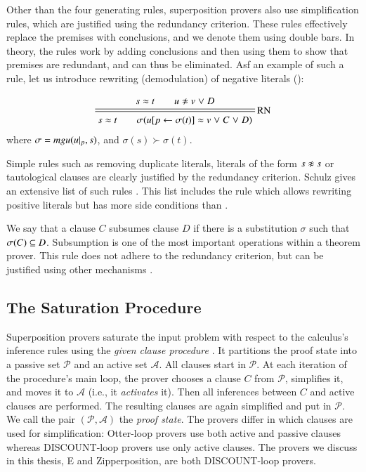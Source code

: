 Other than the four generating rules, superposition provers also use
simplification rules, which are justified using the redundancy criterion. These
rules effectively replace the premises with conclusions, and we denote them
using double bars. In theory, the rules work by adding conclusions and then
using them to show that premises are redundant, and can thus be eliminated. Asf
an example of such a rule, let us introduce rewriting (demodulation) of negative
literals ():

\[
\namedsimp{RN}{s \eq t \qquad u \noteq v \llor D}
              {s \eq t \qquad \sigmacl{u[p \leftarrow \sigma(t)] \eq v \llor C \llor D}}
\]
where $\sigma = \mathit{mgu}(u|_p, s)$, and $\sigma(s) \succ \sigma(t)$.


Simple rules such as removing duplicate literals, literals of the form $s \noteq
s$ or tautological clauses are clearly justified by the redundancy criterion.
Schulz gives an extensive list of such rules \cite{ss-02-brainiac}. This list
includes the rule which allows rewriting positive literals but has more side
conditions than .

We say that a clause $C$ subsumes clause $D$ if there is a substitution $\sigma$
such that $\sigma(C) \subseteq D$. Subsumption is one of the most important
operations within a theorem prover. This rule does not adhere to the redundancy
criterion, but can be justified using other mechanisms \cite{wtrb-20-sat-framework}.

\subsection{The Saturation Procedure}
\label{sec:pre:saturation}

Superposition provers saturate the input problem with respect to the calculus's
inference rules using the \emph{given clause procedure}
\cite{mcw-1997-otter,adf-1995-discount}. It partitions the proof state into a
passive set $\mathcal{P}$ and an active set $\mathcal{A}$. All clauses start in
$\mathcal{P}$. At each iteration of the procedure's main loop, the prover
chooses a clause $C$ from $\mathcal{P}$, simplifies it, and moves it to
$\mathcal{A}$ (i.e., it \emph{activates} it). Then all inferences between $C$ and active clauses are performed.
The resulting clauses are again simplified and put in $\mathcal{P}$.
We call the pair $(\mathcal{P}, \mathcal{A})$ the \emph{proof state}.
The provers differ in which clauses are used for simplification: Otter-loop
\cite{mcw-1997-otter} provers use both active and passive clauses whereas
DISCOUNT-loop \cite{adf-1995-discount} provers use only active clauses.
The provers we discuss in this thesis, E and Zipperposition, are both DISCOUNT-loop provers.

